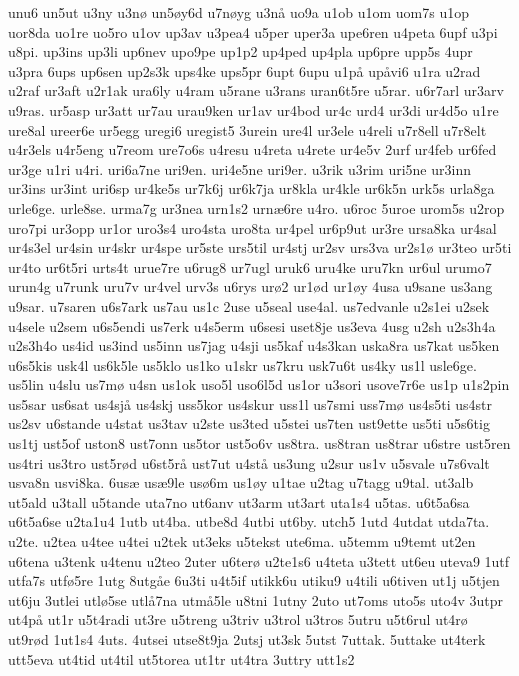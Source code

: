 {unu6
un5ut
u3ny
u3nø
un5øy6d
u7nøyg
u3nå
uo9a
u1ob
u1om
uom7s
u1op
uor8da
uo1re
uo5ro
u1ov
up3av
u3pea4
u5per
uper3a
upe6ren
u4peta
6upf
u3pi
u8pi.
up3ins
up3li
up6nev
upo9pe
up1p2
up4ped
up4pla
up6pre
upp5s
4upr
u3pra
6ups
up6sen
up2s3k
ups4ke
ups5pr
6upt
6upu
u1på
upåvi6
u1ra
u2rad
u2raf
ur3aft
u2r1ak
ura6ly
u4ram
u5rane
u3rans
uran6t5re
u5rar.
u6r7arl
ur3arv
u9ras.
ur5asp
ur3att
ur7au
urau9ken
ur1av
ur4bod
ur4c
urd4
ur3di
ur4d5o
u1re
ure8al
ureer6e
ur5egg
uregi6
uregist5
3urein
ure4l
ur3ele
u4reli
u7r8ell
u7r8elt
u4r3els
u4r5eng
u7reom
ure7o6s
u4resu
u4reta
u4rete
ur4e5v
2urf
ur4feb
ur6fed
ur3ge
u1ri
u4ri.
uri6a7ne
uri9en.
uri4e5ne
uri9er.
u3rik
u3rim
uri5ne
ur3inn
ur3ins
ur3int
uri6sp
ur4ke5s
ur7k6j
ur6k7ja
ur8kla
ur4kle
ur6k5n
urk5s
urla8ga
urle6ge.
urle8se.
urma7g
ur3nea
urn1s2
urnæ6re
u4ro.
u6roc
5uroe
urom5s
u2rop
uro7pi
ur3opp
ur1or
uro3s4
uro4sta
uro8ta
ur4pel
ur6p9ut
ur3re
ursa8ka
ur4sal
ur4s3el
ur4sin
ur4skr
ur4spe
ur5ste
urs5til
ur4stj
ur2sv
urs3va
ur2s1ø
ur3teo
ur5ti
ur4to
ur6t5ri
urts4t
urue7re
u6rug8
ur7ugl
uruk6
uru4ke
uru7kn
ur6ul
urumo7
urun4g
u7runk
uru7v
ur4vel
urv3s
u6rys
urø2
ur1ød
ur1øy
4usa
u9sane
us3ang
u9sar.
u7saren
u6s7ark
us7au
us1c
2use
u5seal
use4al.
us7edvanle
u2s1ei
u2sek
u4sele
u2sem
u6s5endi
us7erk
u4s5erm
u6sesi
uset8je
us3eva
4usg
u2sh
u2s3h4a
u2s3h4o
us4id
us3ind
us5inn
us7jag
u4sji
us5kaf
u4s3kan
uska8ra
us7kat
us5ken
u6s5kis
usk4l
us6k5le
us5klo
us1ko
u1skr
us7kru
usk7u6t
us4ky
us1l
usle6ge.
us5lin
u4slu
us7mø
u4sn
us1ok
uso5l
uso6l5d
us1or
u3sori
usove7r6e
us1p
u1s2pin
us5sar
us6sat
us4sjå
us4skj
uss5kor
us4skur
uss1l
us7smi
uss7mø
us4s5ti
us4str
us2sv
u6stande
u4stat
us3tav
u2ste
us3ted
u5stei
us7ten
ust9ette
us5ti
u5s6tig
us1tj
ust5of
uston8
ust7onn
us5tor
ust5o6v
us8tra.
us8tran
us8trar
u6stre
ust5ren
us4tri
us3tro
ust5rød
u6st5rå
ust7ut
u4stå
us3ung
u2sur
us1v
u5svale
u7s6valt
usva8n
usvi8ka.
6usæ
usæ9le
usø6m
us1øy
u1tae
u2tag
u7tagg
u9tal.
ut3alb
ut5ald
u3tall
u5tande
uta7no
ut6anv
ut3arm
ut3art
uta1s4
u5tas.
u6t5a6sa
u6t5a6se
u2ta1u4
1utb
ut4ba.
utbe8d
4utbi
ut6by.
utch5
1utd
4utdat
utda7ta.
u2te.
u2tea
u4tee
u4tei
u2tek
ut3eks
u5tekst
ute6ma.
u5temm
u9temt
ut2en
u6tena
u3tenk
u4tenu
u2teo
2uter
u6terø
u2te1s6
u4teta
u3tett
ut6eu
uteva9
1utf
utfa7s
utfø5re
1utg
8utgåe
6u3ti
u4t5if
utikk6u
utiku9
u4tili
u6tiven
ut1j
u5tjen
ut6ju
3utlei
utlø5se
utlå7na
utmå5le
u8tni
1utny
2uto
ut7oms
uto5s
uto4v
3utpr
ut4på
ut1r
u5t4radi
ut3re
u5treng
u3triv
u3trol
u3tros
5utru
u5t6rul
ut4rø
ut9rød
1ut1s4
4uts.
4utsei
utse8t9ja
2utsj
ut3sk
5utst
7uttak.
5uttake
ut4terk
utt5eva
ut4tid
ut4til
ut5torea
ut1tr
ut4tra
3uttry
utt1s2
}

